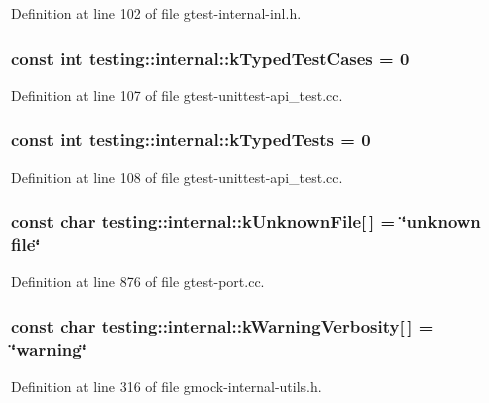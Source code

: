 Definition at line 102 of file gtest-\/internal-\/inl.\+h.

\subsubsection[{\texorpdfstring{k\+Typed\+Test\+Cases}{kTypedTestCases}}]{\setlength{\rightskip}{0pt plus 5cm}const int testing\+::internal\+::k\+Typed\+Test\+Cases = 0}\hypertarget{namespacetesting_1_1internal_a685ea5332074ae63b0ded2b184ac2271}{}\label{namespacetesting_1_1internal_a685ea5332074ae63b0ded2b184ac2271}


Definition at line 107 of file gtest-\/unittest-\/api\+\_\+test.\+cc.

\subsubsection[{\texorpdfstring{k\+Typed\+Tests}{kTypedTests}}]{\setlength{\rightskip}{0pt plus 5cm}const int testing\+::internal\+::k\+Typed\+Tests = 0}\hypertarget{namespacetesting_1_1internal_a53ee2d113744f9ba1d89469db4d7388b}{}\label{namespacetesting_1_1internal_a53ee2d113744f9ba1d89469db4d7388b}


Definition at line 108 of file gtest-\/unittest-\/api\+\_\+test.\+cc.

\subsubsection[{\texorpdfstring{k\+Unknown\+File}{kUnknownFile}}]{\setlength{\rightskip}{0pt plus 5cm}const char testing\+::internal\+::k\+Unknown\+File\mbox{[}$\,$\mbox{]} = \char`\"{}unknown {\bf file}\char`\"{}}\hypertarget{namespacetesting_1_1internal_abae7a5775c901f2fd12b058b00d09840}{}\label{namespacetesting_1_1internal_abae7a5775c901f2fd12b058b00d09840}


Definition at line 876 of file gtest-\/port.\+cc.

\subsubsection[{\texorpdfstring{k\+Warning\+Verbosity}{kWarningVerbosity}}]{\setlength{\rightskip}{0pt plus 5cm}const char testing\+::internal\+::k\+Warning\+Verbosity\mbox{[}$\,$\mbox{]} = \char`\"{}warning\char`\"{}}\hypertarget{namespacetesting_1_1internal_ad9386ccda6b6deac2f7b84784d3088c0}{}\label{namespacetesting_1_1internal_ad9386ccda6b6deac2f7b84784d3088c0}


Definition at line 316 of file gmock-\/internal-\/utils.\+h.

